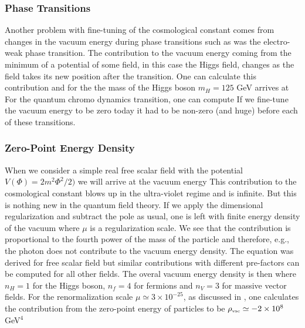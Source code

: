 \subsubsection{Phase Transitions}
Another problem with fine-tuning of the cosmological constant comes from changes in the vacuum energy during phase transitions such as was the electro-weak phase transition. The contribution to the vacuum energy coming from the minimum of a potential of some field, in this case the Higgs field, changes as the field takes its new position after the transition. One can calculate this contribution \parencite{2012CRPhy..13..566M} and for the the mass of the Higgs boson $m_H=125$ GeV arrives at
For the quantum chromo dynamics transition, one can compute
If we fine-tune the vacuum energy to be zero today it had to be non-zero (and huge) before each of these transitions.
\subsubsection{Zero-Point Energy Density}
When we consider a simple real free scalar field with the potential $V(\Phi)=2m^2\Phi^2/2)$ we will arrive at the vacuum energy
This contribution to the cosmological constant blows up in the ultra-violet regime and is infinite. But this is nothing new in the quantum field theory. If we apply the dimensional regularization \parencite{tHooft:1972tcz} and subtract the pole as usual, one is left with finite energy density of the vacuum
where $\mu$ is a regularization scale. We see that the contribution is proportional to the fourth power of the mass of the particle and therefore, e.g., the photon does not contribute to the vacuum energy density. The equation was derived for free scalar field but similar contributions with different pre-factors can be computed for all other fields. The overal vacuum energy density is then
where $n_H=1$ for the Higgs boson, $n_f=4$ for fermions and $n_V=3$ for massive vector fields. For the renormalization scale $\mu\simeq3\times10^{-25}$, as discussed in \textcite{2011arXiv1105.6296K}, one calculates the contribution from the zero-point energy of particles to be  $\rho_\text{\tiny vac}\simeq-2\times10^8$ GeV$^4$
